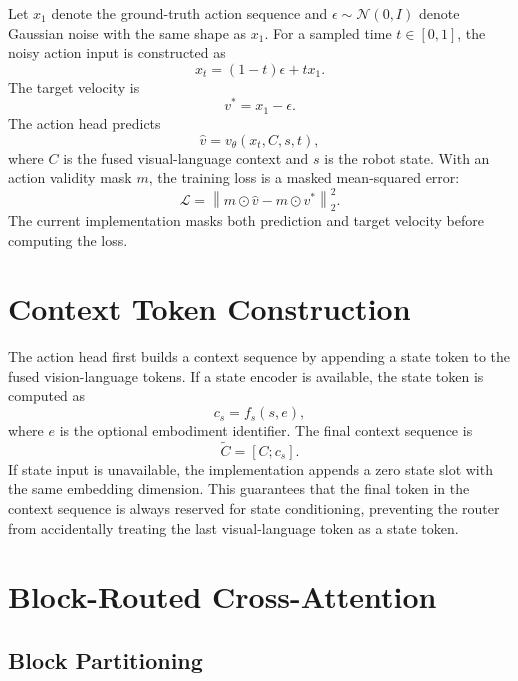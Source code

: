 \documentclass[11pt]{article}
\begin{document}
Let $x_1$ denote the ground-truth action sequence and $\epsilon \sim \mathcal{N}(0,I)$ denote Gaussian noise with the same shape as $x_1$. For a sampled time $t \in [0,1]$, the noisy action input is constructed as
\begin{equation}
    x_t = (1-t)\epsilon + t x_1.
\end{equation}
The target velocity is
\begin{equation}
    v^* = x_1 - \epsilon.
\end{equation}
The action head predicts
\begin{equation}
    \hat{v} = v_\theta(x_t, C, s, t),
\end{equation}
where $C$ is the fused visual-language context and $s$ is the robot state. With an action validity mask $m$, the training loss is a masked mean-squared error:
\begin{equation}
    \mathcal{L}
    =
    \left\|
    m \odot \hat{v}
    -
    m \odot v^*
    \right\|_2^2.
\end{equation}
The current implementation masks both prediction and target velocity before computing the loss.

\section{Context Token Construction}

The action head first builds a context sequence by appending a state token to the fused vision-language tokens. If a state encoder is available, the state token is computed as
\begin{equation}
    c_s = f_s(s, e),
\end{equation}
where $e$ is the optional embodiment identifier. The final context sequence is
\begin{equation}
    \tilde{C} = [C; c_s].
\end{equation}
If state input is unavailable, the implementation appends a zero state slot with the same embedding dimension. This guarantees that the final token in the context sequence is always reserved for state conditioning, preventing the router from accidentally treating the last visual-language token as a state token.

\section{Block-Routed Cross-Attention}

\subsection{Block Partitioning}
\end{document}
